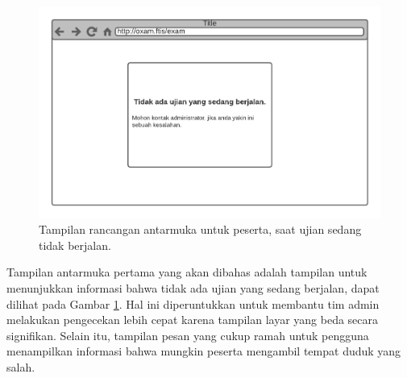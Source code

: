     \begin{figure}[H]
        \centering
        \includegraphics[width=0.7\paperwidth]{Gambar/mockups/Mockup--Peserta - Blankstate.pdf}
        \caption{Tampilan rancangan antarmuka untuk peserta, saat ujian sedang tidak berjalan.}
        \label{fig:mockup_peserta_blankstate}
    \end{figure}
     Tampilan antarmuka pertama yang akan dibahas adalah tampilan untuk
     menunjukkan informasi bahwa tidak ada ujian yang sedang berjalan, dapat
     dilihat pada Gambar \ref{fig:mockup_peserta_blankstate}. Hal ini
     diperuntukkan untuk membantu tim admin melakukan pengecekan lebih cepat
     karena tampilan layar yang beda secara signifikan. Selain itu, tampilan
     pesan yang cukup ramah untuk pengguna menampilkan informasi bahwa mungkin
     peserta mengambil tempat duduk yang salah.

